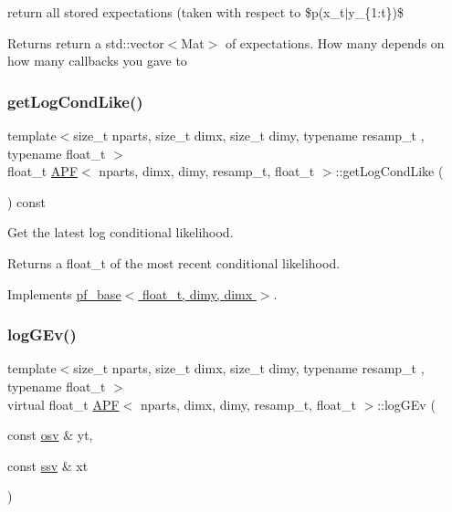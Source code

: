 return all stored expectations (taken with respect to \$p(x\+\_\+t$\vert$y\+\_\+\{1\+:t\})\$ 

\begin{DoxyReturn}{Returns}
return a std\+::vector$<$\+Mat$>$ of expectations. How many depends on how many callbacks you gave to 
\end{DoxyReturn}
\mbox{\label{classAPF_adc35c009dcf5b3289a4d46279527e024}} 
\subsubsection{\texorpdfstring{get\+Log\+Cond\+Like()}{getLogCondLike()}}
{\footnotesize\ttfamily template$<$size\+\_\+t nparts, size\+\_\+t dimx, size\+\_\+t dimy, typename resamp\+\_\+t , typename float\+\_\+t $>$ \\
float\+\_\+t \hyperlink{classAPF}{A\+PF}$<$ nparts, dimx, dimy, resamp\+\_\+t, float\+\_\+t $>$\+::get\+Log\+Cond\+Like (\begin{DoxyParamCaption}{ }\end{DoxyParamCaption}) const\hspace{0.3cm}{\ttfamily [virtual]}}



Get the latest log conditional likelihood. 

\begin{DoxyReturn}{Returns}
a float\+\_\+t of the most recent conditional likelihood. 
\end{DoxyReturn}


Implements \hyperlink{classpf__base}{pf\+\_\+base$<$ float\+\_\+t, dimy, dimx $>$}.

\mbox{\label{classAPF_ab81a714dacc1ee5ea1aa66ffee46f832}} 
\subsubsection{\texorpdfstring{log\+G\+Ev()}{logGEv()}}
{\footnotesize\ttfamily template$<$size\+\_\+t nparts, size\+\_\+t dimx, size\+\_\+t dimy, typename resamp\+\_\+t , typename float\+\_\+t $>$ \\
virtual float\+\_\+t \hyperlink{classAPF}{A\+PF}$<$ nparts, dimx, dimy, resamp\+\_\+t, float\+\_\+t $>$\+::log\+G\+Ev (\begin{DoxyParamCaption}\item[{const \hyperlink{classAPF_aa8ac25c475e54ddf21999f28727a049e}{osv} \&}]{yt,  }\item[{const \hyperlink{classAPF_a5f96da87f00ff75af1232f9021daf06a}{ssv} \&}]{xt }\end{DoxyParamCaption})\hspace{0.3cm}{\ttfamily [pure virtual]}}



